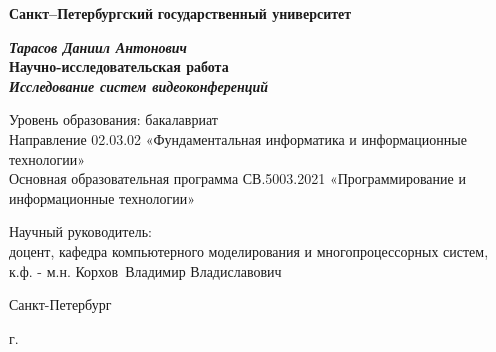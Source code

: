 
\begin{titlepage}
\begin{center}

\textbf{Санкт--Петербургский}
\textbf{государственный университет}

\vspace{35mm}

\textbf{\textit{\large Тарасов Даниил Антонович}} \\[8mm]
\textbf{\large Научно-исследовательская работа}\\[3mm]
\textbf{\textit{\large Исследование систем видеоконференций}}

\vspace{20mm}
Уровень образования: бакалавриат\\
Направление 02.03.02 «Фундаментальная информатика и информационные технологии»\\
Основная образовательная программа СВ.5003.2021
«Программирование и информационные технологии»\\[25mm]


\begin{flushright}
\begin{minipage}[t]{0.65\textwidth}
{Научный руководитель:} \\
доцент, кафедра компьютерного моделирования и многопроцессорных систем, к.ф. - м.н. Корхов~Владимир Владиславович

\vspace{10mm}

\end{minipage}
\end{flushright}

\vfill 

{Санкт-Петербург}
\par{\the\year{} г.}
\end{center}
\end{titlepage}
\restoregeometry
\addtocounter{page}{1}
